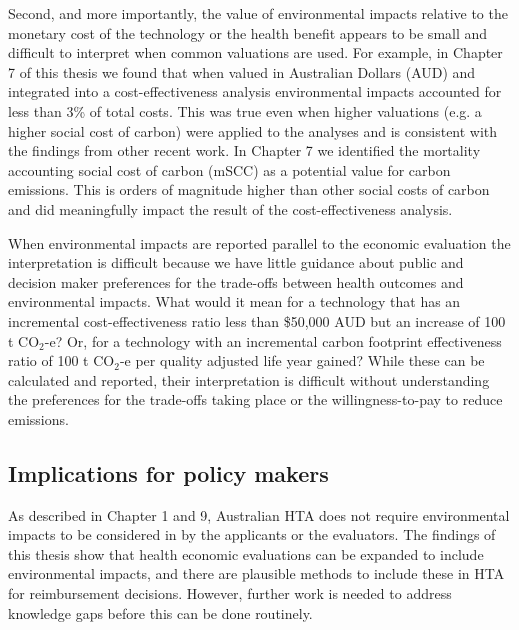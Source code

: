 \begin{refsection}
Second, and more importantly, the value of environmental impacts relative to the monetary cost of the technology or the health benefit appears to be small and difficult to interpret when common valuations are used. For example, in Chapter 7 of this thesis we found that when valued in Australian Dollars (AUD) and integrated into a cost-effectiveness analysis environmental impacts accounted for less than 3\% of total costs. This was true even when higher valuations (e.g. a higher social cost of carbon) were applied to the analyses and is consistent with the findings from other recent work.\cite{ducrot_integrating_2025} In Chapter 7 we identified the mortality accounting social cost of carbon (mSCC) as a potential value for carbon emissions. This is orders of magnitude higher than other social costs of carbon and did meaningfully impact the result of the cost-effectiveness analysis.

When environmental impacts are reported parallel to the economic evaluation the interpretation is difficult because we have little guidance about public and decision maker preferences for the trade-offs between health outcomes and environmental impacts. What would it mean for a technology that has an incremental cost-effectiveness ratio less than \$50,000 AUD but an increase of 100 t CO$_{2}$-e? Or, for a technology with an incremental carbon footprint effectiveness ratio of 100 t CO$_{2}$-e per quality adjusted life year gained? While these can be calculated and reported, their interpretation is difficult without understanding the preferences for the trade-offs taking place or the willingness-to-pay to reduce emissions. 

\subsection{Implications for policy makers}
As described in Chapter 1 and 9, Australian HTA does not require environmental impacts to be considered in by the applicants or the evaluators. The findings of this thesis show that health economic evaluations can be expanded to include environmental impacts, and there are plausible methods to include these in HTA for reimbursement decisions. However, further work is needed to address knowledge gaps before this can be done routinely.


\end{refsection}
